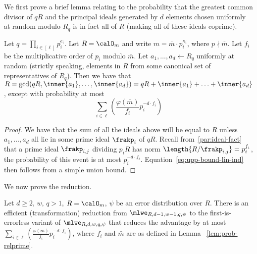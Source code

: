 We first prove a brief lemma relating to the probability that the
greatest common divisor of $qR$ and the 
principal ideals generated  by $d$
elements chosen uniformly at random modulo $R_q$  is in fact all of
$R$ (making all of these ideals coprime). 
\begin{lemma}\label{lem:prob-relprime}
Let $q=\prod_{i \in
    [\ell]}p_i^{e_i}$. Let $R=\calO_{m}$ and write $m=\bar{m}\cdot
  p_i^{\kappa_i}$, where $p \nmid \bar{m}$. Let $f_i$ be the
  multiplicative order of $p_i$ modulo $\bar{m}$. Let $a_1, \ldots,
  a_d \gets R_q$ uniformly at random (strictly speaking, elements in
  $R$ from
  some canonical set of representatives of $R_q$). Then we have that 
$R=\gcd(qR,\inner{a_1},\ldots,\inner{a_d})=qR+\inner{a_1}+\ldots+\inner{a_d}$,
except with probability at most
\begin{equation}
\label{eq:upp-bound-lin-ind}\sum_{i \in
  \ell}\left(\frac{\varphi(\bar{m})}{f_i}p_i^{-d\cdot f_i} \right)
\end{equation}
\end{lemma}
\begin{proof}
  We have that the sum of all the ideals above will be equal to $R$
  unless $a_1, \ldots, a_d$ all lie in some prime ideal $\frakp_i$ of
  $qR$.  Recall from~\ref{par:ideal-fact} that a prime ideal
  $\frakp_{i,j}$ dividing $p_iR$ has norm
  $\length{R/\frakp_{i,j}}=p_i^{f_i}$, the probability of this event
  is at most $p_i^{-d\cdot f_i}$. Equation~\ref{eq:upp-bound-lin-ind}
  then follows from a simple union bound.
\end{proof}


We now prove the reduction.
\begin{lemma}\label{lem:first-errorless}
  Let $d \geq 2$, $w$, $q > 1$, $R=\calO_{m}$, $\psi$ be an error distribution
  over $R$. There is an efficient (transformation) reduction
  from $\mlwe_{R,d-1,w-1,q,\psi}$ to the first-is-errorless variant of
  $\mlwe_{R,d,w,q,\psi}$ that reduces the advantage by at most
$\sum_{i \in
  \ell}\left(\frac{\varphi(\bar{m})}{f_i}p_i^{-d\cdot f_i} \right)$, where
  $f_i$ and $\bar{m}$ are as defined in Lemma ~\ref{lem:prob-relprime}.
\end{lemma}

